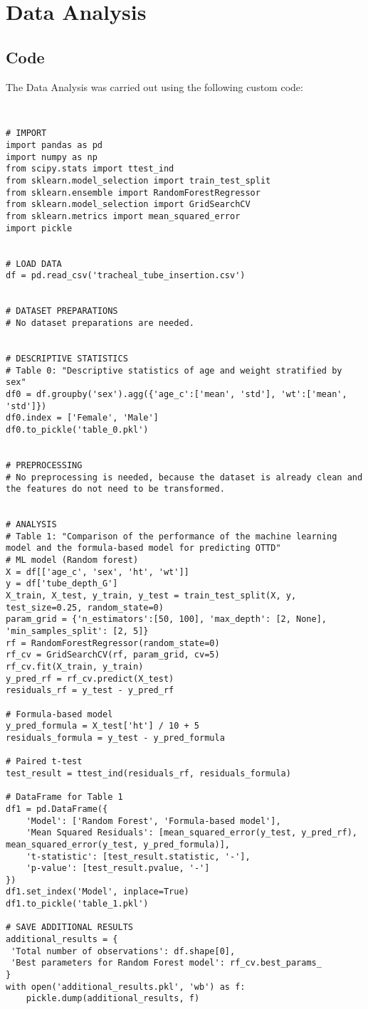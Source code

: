 \documentclass[11pt]{article}
\begin{document}
\section{Data Analysis}
\subsection{{Code}}
The Data Analysis was carried out using the following custom code:

\begin{verbatim}


# IMPORT
import pandas as pd
import numpy as np
from scipy.stats import ttest_ind
from sklearn.model_selection import train_test_split
from sklearn.ensemble import RandomForestRegressor
from sklearn.model_selection import GridSearchCV
from sklearn.metrics import mean_squared_error
import pickle


# LOAD DATA
df = pd.read_csv('tracheal_tube_insertion.csv')


# DATASET PREPARATIONS
# No dataset preparations are needed.


# DESCRIPTIVE STATISTICS
# Table 0: "Descriptive statistics of age and weight stratified by sex"
df0 = df.groupby('sex').agg({'age_c':['mean', 'std'], 'wt':['mean', 'std']})
df0.index = ['Female', 'Male']
df0.to_pickle('table_0.pkl')


# PREPROCESSING 
# No preprocessing is needed, because the dataset is already clean and the features do not need to be transformed.


# ANALYSIS
# Table 1: "Comparison of the performance of the machine learning model and the formula-based model for predicting OTTD"
# ML model (Random forest)
X = df[['age_c', 'sex', 'ht', 'wt']]
y = df['tube_depth_G']
X_train, X_test, y_train, y_test = train_test_split(X, y, test_size=0.25, random_state=0)
param_grid = {'n_estimators':[50, 100], 'max_depth': [2, None], 'min_samples_split': [2, 5]}
rf = RandomForestRegressor(random_state=0)
rf_cv = GridSearchCV(rf, param_grid, cv=5)
rf_cv.fit(X_train, y_train)
y_pred_rf = rf_cv.predict(X_test)
residuals_rf = y_test - y_pred_rf

# Formula-based model
y_pred_formula = X_test['ht'] / 10 + 5
residuals_formula = y_test - y_pred_formula

# Paired t-test
test_result = ttest_ind(residuals_rf, residuals_formula)

# DataFrame for Table 1
df1 = pd.DataFrame({
    'Model': ['Random Forest', 'Formula-based model'],
    'Mean Squared Residuals': [mean_squared_error(y_test, y_pred_rf), mean_squared_error(y_test, y_pred_formula)],
    't-statistic': [test_result.statistic, '-'],
    'p-value': [test_result.pvalue, '-']
})
df1.set_index('Model', inplace=True)
df1.to_pickle('table_1.pkl')

# SAVE ADDITIONAL RESULTS
additional_results = {
 'Total number of observations': df.shape[0],
 'Best parameters for Random Forest model': rf_cv.best_params_
}
with open('additional_results.pkl', 'wb') as f:
    pickle.dump(additional_results, f)

\end{verbatim}
\end{document}
